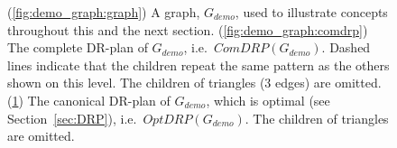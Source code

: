 \begin{figure}
\begin{subfigure}{0.3\linewidth}
    \caption{}\label{fig:demo_graph:candrp}
  \end{subfigure}%
  \caption{(\ref{fig:demo_graph:graph}) A graph, $G_{demo}$, used to illustrate concepts throughout this and the next section. (\ref{fig:demo_graph:comdrp}) The complete DR-plan of $G_{demo}$, i.e.\ $ComDRP(G_{demo})$. Dashed lines indicate that the children repeat the same pattern as the others shown on this level. The children of triangles (3 edges) are omitted. (\ref{fig:demo_graph:candrp}) The canonical DR-plan of $G_{demo}$, which is optimal (see Section~\ref{sec:DRP}), i.e.\ $OptDRP(G_{demo})$. The children of triangles are omitted.}
  \label{fig:demo_graph}
\end{figure}%




%
%
%
%






